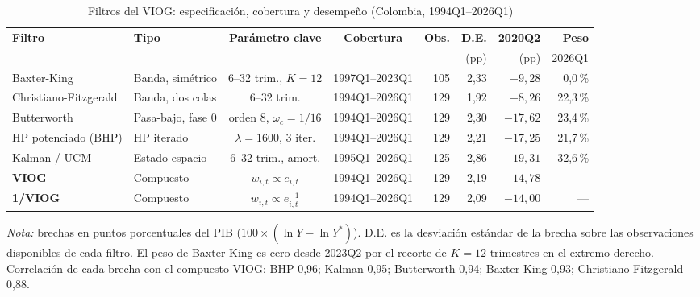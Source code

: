 \documentclass[11pt]{article}
\begin{document}
\begin{table}[htbp]
\centering
\caption{Filtros del VIOG: especificación, cobertura y desempeño (Colombia, 1994Q1--2026Q1)}
\label{tab:filtros}
\footnotesize
\setlength{\tabcolsep}{3.8pt}
\begin{tabular}{llccrrrr}
\toprule
\textbf{Filtro} & \textbf{Tipo} & \textbf{Parámetro clave} & \textbf{Cobertura} & \textbf{Obs.} &
\textbf{D.E.} & \textbf{2020Q2} & \textbf{Peso} \\
 & & & & & (pp) & (pp) & 2026Q1 \\
\midrule
Baxter-King           & Banda, simétrico  & 6--32 trim., $K{=}12$    & 1997Q1--2023Q1 & 105 & 2,33 & $-9{,}28$  & 0,0\,\%  \\
Christiano-Fitzgerald & Banda, dos colas  & 6--32 trim.              & 1994Q1--2026Q1 & 129 & 1,92 & $-8{,}26$  & 22,3\,\% \\
Butterworth           & Pasa-bajo, fase 0 & orden 8, $\omega_c=1/16$ & 1994Q1--2026Q1 & 129 & 2,30 & $-17{,}62$ & 23,4\,\% \\
HP potenciado (BHP)   & HP iterado        & $\lambda=1600$, 3 iter.  & 1994Q1--2026Q1 & 129 & 2,21 & $-17{,}25$ & 21,7\,\% \\
Kalman / UCM          & Estado-espacio    & 6--32 trim., amort.      & 1995Q1--2026Q1 & 125 & 2,86 & $-19{,}31$ & 32,6\,\% \\
\midrule
\textbf{VIOG}         & Compuesto & $w_{i,t}\propto e_{i,t}$      & 1994Q1--2026Q1 & 129 & 2,19 & $-14{,}78$ & --- \\
\textbf{1/VIOG}       & Compuesto & $w_{i,t}\propto e_{i,t}^{-1}$ & 1994Q1--2026Q1 & 129 & 2,09 & $-14{,}00$ & --- \\
\bottomrule
\end{tabular}

\vspace{0.4em}
\begin{minipage}{0.95\textwidth}
\footnotesize
\textit{Nota:} brechas en puntos porcentuales del PIB ($100\times(\ln Y-\ln Y^{*})$). D.E. es la
desviación estándar de la brecha sobre las observaciones disponibles de cada filtro. El peso de
Baxter-King es cero desde 2023Q2 por el recorte de $K=12$ trimestres en el extremo derecho.
Correlación de cada brecha con el compuesto VIOG: BHP 0,96; Kalman 0,95; Butterworth 0,94;
Baxter-King 0,93; Christiano-Fitzgerald 0,88.
\end{minipage}
\end{table}

\renewcommand{\refname}{Referencias}
\small

\end{document}

